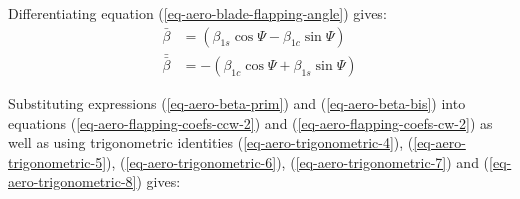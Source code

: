 \vfill

Differentiating equation (\ref{eq-aero-blade-flapping-angle}) gives:
\begin{align}
  \label{eq-aero-beta-prim}
  \bar \beta &=
  \left( \beta_{1s} \cos \Psi - \beta_{1c} \sin \Psi \right) \\
  \label{eq-aero-beta-bis}
  \bar{\bar \beta} &= -
  \left( \beta_{1c} \cos \Psi + \beta_{1s} \sin \Psi  \right)
\end{align}

Substituting expressions (\ref{eq-aero-beta-prim}) and (\ref{eq-aero-beta-bis}) into equations (\ref{eq-aero-flapping-coefs-ccw-2}) and (\ref{eq-aero-flapping-coefs-cw-2}) as well as using trigonometric identities (\ref{eq-aero-trigonometric-4}), (\ref{eq-aero-trigonometric-5}), (\ref{eq-aero-trigonometric-6}), (\ref{eq-aero-trigonometric-7}) and (\ref{eq-aero-trigonometric-8}) gives:
